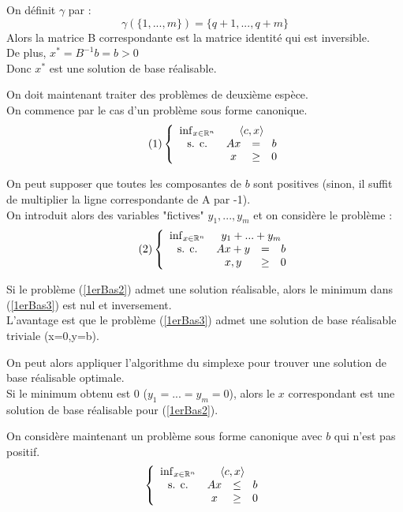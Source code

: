 \begin{dem}
	On définit $\gamma$ par :
	\[\gamma(\{1,...,m\})=\{q+1,...,q+m\}\]
	Alors la matrice B correspondante est la matrice identité qui est inversible.\\
	De plus, $x^*=B^{-1}b=b>0$ \\
	Donc $x^*$ est une solution de base réalisable.
\end{dem}

On doit maintenant traiter des problèmes de deuxième espèce.\\
On commence par le cas d'un problème sous forme canonique.
\begin{equation}\tag{1} \label{1erBas2}
	\left\{ \begin{array}{c c c c} \inf_{x\in\mathbb{R}^n} & \multicolumn{3}{c}{\langle c,x\rangle} \\
						\text{s. c.}     & Ax &=& b \\
								& x &\geq& 0
	\end{array} \right.
\end{equation}

On peut supposer que toutes les composantes de $b$ sont positives (sinon, il suffit de multiplier la ligne correspondante de A par -1).\\
On introduit alors des variables "fictives" $y_1,...,y_m$ et on considère le problème :
\begin{equation}\tag{2} \label{1erBas3}
	\left\{ \begin{array}{c c c c} \inf_{x\in\mathbb{R}^n} & \multicolumn{3}{c}{y_1+...+y_m} \\
						\text{s. c.}     & Ax +y&=& b \\
								& x,y &\geq& 0
	\end{array} \right.
\end{equation}


Si le problème (\ref{1erBas2}) admet une solution réalisable, alors le minimum dans (\ref{1erBas3}) est nul et inversement.\\
L'avantage est que le problème (\ref{1erBas3}) admet une solution de base réalisable triviale (x=0,y=b).

\bigskip
On peut alors appliquer l'algorithme du simplexe pour trouver une solution de base réalisable optimale.\\
Si le minimum obtenu est 0 ($y_1=...=y_m=0$), alors le $x$ correspondant est une solution de base réalisable pour (\ref{1erBas2}). 

\bigskip
On considère maintenant un problème sous forme canonique avec $b$ qui n'est pas positif.
\[\left\{ \begin{array}{c c c c} \inf_{x\in\mathbb{R}^n} & \multicolumn{3}{c}{\langle c,x\rangle} \\
						\text{s. c.}     & Ax &\leq& b \\
								& x &\geq& 0
	\end{array} \right.\]


